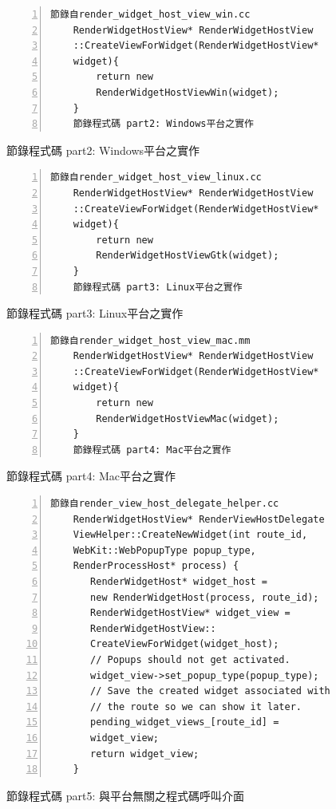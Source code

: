 \documentclass[10pt, twocolumn]{article}
\begin{document}
\begin{figure}
\fontsize{8pt}{8pt}\selectfont
\begin{Verbatim}[numbers=left,framesep=1mm,numbersep=-12pt]
	節錄自render_widget_host_view_win.cc 
	RenderWidgetHostView* RenderWidgetHostView
	::CreateViewForWidget(RenderWidgetHostView*
	widget){
	    return new 
	    RenderWidgetHostViewWin(widget);
	}
	節錄程式碼 part2: Windows平台之實作
\end{Verbatim}
\caption{節錄程式碼 part2: Windows平台之實作}
\label{windowsimple}
\end{figure}

\begin{figure}
\fontsize{8pt}{8pt}\selectfont
\begin{Verbatim}[numbers=left,framesep=1mm,numbersep=-12pt]
	節錄自render_widget_host_view_linux.cc
	RenderWidgetHostView* RenderWidgetHostView
	::CreateViewForWidget(RenderWidgetHostView*
	widget){
	    return new 
	    RenderWidgetHostViewGtk(widget);
	}
	節錄程式碼 part3: Linux平台之實作
\end{Verbatim}
\caption{節錄程式碼 part3: Linux平台之實作}
\label{linuximpl}
\end{figure}

\begin{figure}
\fontsize{8pt}{8pt}\selectfont
\begin{Verbatim}[numbers=left,framesep=1mm,numbersep=-12pt]
	節錄自render_widget_host_view_mac.mm
	RenderWidgetHostView* RenderWidgetHostView
	::CreateViewForWidget(RenderWidgetHostView*
	widget){
	    return new 
	    RenderWidgetHostViewMac(widget);
	}
	節錄程式碼 part4: Mac平台之實作
\end{Verbatim}
\caption{節錄程式碼 part4: Mac平台之實作}
\label{macimpl}
\end{figure}

\begin{figure}
\fontsize{8pt}{8pt}\selectfont
\begin{Verbatim}[numbers=left,framesep=1mm,numbersep=-12pt]
	節錄自render_view_host_delegate_helper.cc
	RenderWidgetHostView* RenderViewHostDelegate
	ViewHelper::CreateNewWidget(int route_id, 
	WebKit::WebPopupType popup_type, 
	RenderProcessHost* process) {
	   RenderWidgetHost* widget_host =
	   new RenderWidgetHost(process, route_id);
	   RenderWidgetHostView* widget_view =
	   RenderWidgetHostView::
	   CreateViewForWidget(widget_host);
	   // Popups should not get activated.
	   widget_view->set_popup_type(popup_type);
	   // Save the created widget associated with
	   // the route so we can show it later.
	   pending_widget_views_[route_id] =
	   widget_view;
	   return widget_view;
	}
\end{Verbatim}
\caption{節錄程式碼 part5: 與平台無關之程式碼呼叫介面}
\label{crossplatformcall}
\end{figure}
\end{document}
